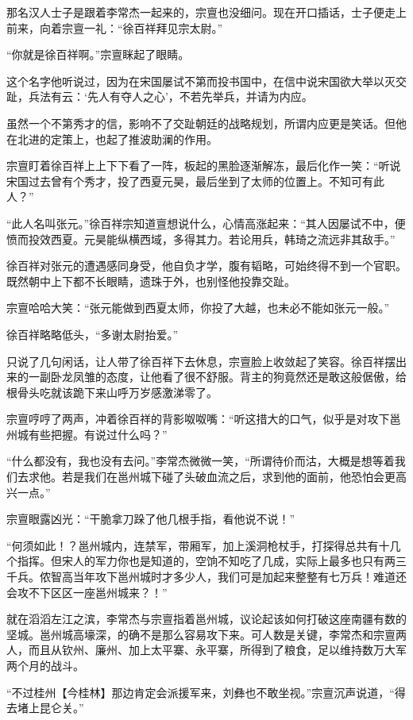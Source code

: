 那名汉人士子是跟着李常杰一起来的，宗亶也没细问。现在开口插话，士子便走上前来，向着宗亶一礼：“徐百祥拜见宗太尉。”

“你就是徐百祥啊。”宗亶眯起了眼睛。

这个名字他听说过，因为在宋国屡试不第而投书国中，在信中说宋国欲大举以灭交趾，兵法有云：‘先人有夺人之心’，不若先举兵，并请为内应。

虽然一个不第秀才的信，影响不了交趾朝廷的战略规划，所谓内应更是笑话。但他在北进的定策上，也起了推波助澜的作用。

宗亶盯着徐百祥上上下下看了一阵，板起的黑脸逐渐解冻，最后化作一笑：“听说宋国过去曾有个秀才，投了西夏元昊，最后坐到了太师的位置上。不知可有此人？”

“此人名叫张元。”徐百祥宗知道亶想说什么，心情高涨起来：“其人因屡试不中，便愤而投效西夏。元昊能纵横西域，多得其力。若论用兵，韩琦之流远非其敌手。”

徐百祥对张元的遭遇感同身受，他自负才学，腹有韬略，可始终得不到一个官职。既然朝中上下都不长眼睛，遗珠于外，也别怪他投靠交趾。

宗亶哈哈大笑：“张元能做到西夏太师，你投了大越，也未必不能如张元一般。”

徐百祥略略低头，“多谢太尉抬爱。”

只说了几句闲话，让人带了徐百祥下去休息，宗亶脸上收敛起了笑容。徐百祥摆出来的一副卧龙凤雏的态度，让他看了很不舒服。背主的狗竟然还是敢这般倨傲，给根骨头吃就该跪下来山呼万岁感激涕零了。

宗亶哼哼了两声，冲着徐百祥的背影呶呶嘴：“听这措大的口气，似乎是对攻下邕州城有些把握。有说过什么吗？”

“什么都没有，我也没有去问。”李常杰微微一笑，“所谓待价而沽，大概是想等着我们去求他。若是我们在邕州城下碰了头破血流之后，求到他的面前，他恐怕会更高兴一点。”

宗亶眼露凶光：“干脆拿刀跺了他几根手指，看他说不说！”

“何须如此！？邕州城内，连禁军，带厢军，加上溪洞枪杖手，打探得总共有十几个指挥。但宋人的军力你也是知道的，空饷不知吃了几成，实际上最多也只有两三千兵。侬智高当年攻下邕州城时才多少人，我们可是加起来整整有七万兵！难道还会攻不下区区一座邕州城来？！”

就在滔滔左江之滨，李常杰与宗亶指着邕州城，议论起该如何打破这座南疆有数的坚城。邕州城高壕深，的确不是那么容易攻下来。可人数是关键，李常杰和宗亶两人，而且从钦州、廉州、加上太平寨、永平寨，所得到了粮食，足以维持数万大军两个月的战斗。

“不过桂州【今桂林】那边肯定会派援军来，刘彝也不敢坐视。”宗亶沉声说道，“得去堵上昆仑关。”

